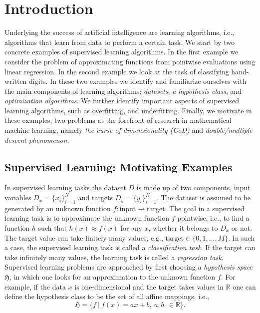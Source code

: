 \chapter{Introduction} %

\label{Chapter1} %
\setcounter{chapter}{1}

\newcommand{\keyword}[1]{\textbf{#1}}
\newcommand{\tabhead}[1]{\textbf{#1}}
\newcommand{\code}[1]{\texttt{#1}}
\newcommand{\file}[1]{\texttt{\bfseries#1}}
\newcommand{\option}[1]{\texttt{\itshape#1}}
Underlying the success of artificial intelligence are learning algorithms, i.e.,
algorithms that learn from data to perform a certain task. We start by
two concrete examples of supervised learning algorithms. In the first example we
consider the problem of approximating functions from pointwise evaluations using linear regression. In the second example we look at the task of
classifying hand-written digits. In these two examples we identify and
familiarize ourselves with the main components of learning algorithms;
\emph{datasets}, \emph{a hypothesis class}, and \emph{optimization algorithms}.
We further identify important aspects of supervised learning algorithms, such as
overfitting, and underfitting. Finally, we motivate in these examples, two
problems at the forefront of research in mathematical machine learning, namely
\emph{the curse of dimensionality (CoD)} and \emph{double/multiple descent phenomenon}. 
 
\section{Supervised Learning: Motivating Examples}
In supervised learning tasks the dataset $D$ is made up of
two components, input variables $D_x = \{x_i\}_{i = 1}^N$ and targets $D_y = \{y_i\}_{i=1}^N$. The dataset is assumed to be
generated by an unknown function $f: \text{input} \to \text{target}$. The goal in
a supervised learning task is to approximate the unknown function $f$ pointwise,
i.e., to find a function $h$ such that $h(x) \approx f(x)$ for any $x$, whether
it belongs to $D_x$ or not. The target value can take finitely many values,
e.g., $\text{target} \in \{0,1, \dots, M\}$. In such a case, the supervised
learning task is called a \emph{classification task}. If the target can take
infinitely many values, the learning task is called a \emph{regression task}.  
Supervised learning problems are approached by first choosing a \emph{hypothesis
space} $\mathfrak{H}$, in which one looks for an approximation to the unknown function $f$. For example, if the data $x$ is one-dimensional and the target
takes values in $\mathbb{R}$ one can define the hypothesis class to be the set of
all affine mappings, i.e., 
\begin{equation}
    \label{eq:affine_mappings}
\mathfrak{H} = \bigl\{f \ | \ f(x) = ax + b, \ a, b, \in \mathbb{R}    
\bigr\}.
\end{equation}


